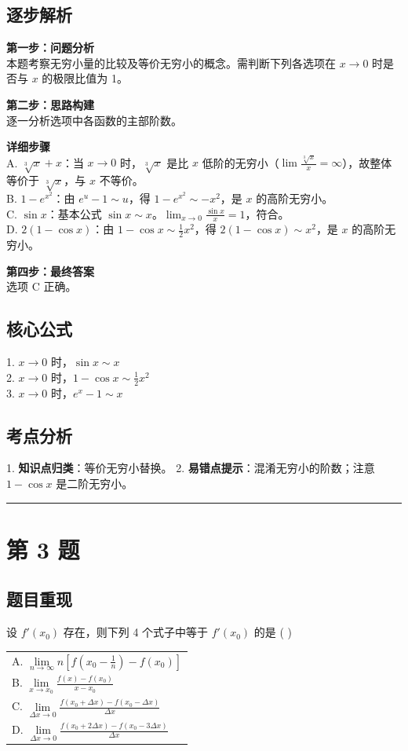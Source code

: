 \documentclass[10pt, a4paper]{ctexart}
\newcommand{\problemheader}{
    \vspace{0.5cm}
    \noindent\rule[0.5ex]{\linewidth}{2pt} %
}
\newcommand{\analysisheader}{
    \vspace{0.2cm}
    \noindent{\color{red}\rule[0.5ex]{\linewidth}{0.5pt}} %
    \vspace{0.1cm}
}
\begin{document}
\analysisheader
{\color{red}
\subsection*{逐步解析}
\textbf{第一步：问题分析} \\
本题考察无穷小量的比较及等价无穷小的概念。需判断下列各选项在 $x \to 0$ 时是否与 $x$ 的极限比值为 1。

\textbf{第二步：思路构建} \\
逐一分析选项中各函数的主部阶数。

\textbf{详细步骤} \\
A. $\sqrt[3]{x} + x$：当 $x \to 0$ 时，$\sqrt[3]{x}$ 是比 $x$ 低阶的无穷小（$\lim \frac{\sqrt[3]{x}}{x} = \infty$），故整体等价于 $\sqrt[3]{x}$，与 $x$ 不等价。 \\
B. $1 - e^{x^2}$：由 $e^u - 1 \sim u$，得 $1 - e^{x^2} \sim -x^2$，是 $x$ 的高阶无穷小。 \\
C. $\sin x$：基本公式 $\sin x \sim x$。$\lim_{x\to 0} \frac{\sin x}{x} = 1$，符合。 \\
D. $2(1-\cos x)$：由 $1-\cos x \sim \frac{1}{2}x^2$，得 $2(1-\cos x) \sim x^2$，是 $x$ 的高阶无穷小。

\textbf{第四步：最终答案} \\
选项 C 正确。

\subsection*{核心公式}
1. $x \to 0$ 时，$\sin x \sim x$ \\
2. $x \to 0$ 时，$1 - \cos x \sim \frac{1}{2}x^2$ \\
3. $x \to 0$ 时，$e^x - 1 \sim x$

\subsection*{考点分析}
1. \textbf{知识点归类}：等价无穷小替换。
2. \textbf{易错点提示}：混淆无穷小的阶数；注意 $1-\cos x$ 是二阶无穷小。
}

\problemheader
\section*{第 3 题}
\subsection*{题目重现}
设 $f'(x_0)$ 存在，则下列 4 个式子中等于 $f'(x_0)$ 的是 ( \quad ) \\
\begin{tabularx}{\linewidth}{@{} X @{}}
    A. $\lim\limits_{n \to \infty} n \left[ f\left(x_0 - \frac{1}{n}\right) - f(x_0) \right]$ \\
    B. $\lim\limits_{x \to x_0} \frac{f(x) - f(x_0)}{x - x_0}$ \\
    C. $\lim\limits_{\Delta x \to 0} \frac{f(x_0 + \Delta x) - f(x_0 - \Delta x)}{\Delta x}$ \\
    D. $\lim\limits_{\Delta x \to 0} \frac{f(x_0 + 2\Delta x) - f(x_0 - 3\Delta x)}{\Delta x}$
\end{tabularx}
\end{document}
